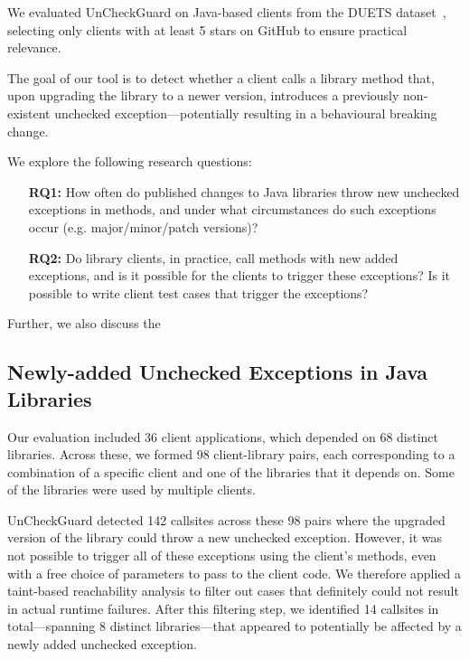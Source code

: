 We evaluated UnCheckGuard on Java-based clients from the DUETS dataset~\cite{durieux21:_duets}, selecting only clients with at least 5 stars on GitHub to ensure practical relevance.

The goal of our tool is to detect whether a client calls a library method that, upon upgrading the library to a newer version, introduces a previously non-existent unchecked exception—potentially resulting in a behavioural breaking change.

We explore the following research questions:

\begin{itemize}
  \item[\textbf{RQ1:}] How often do published changes to Java libraries throw new unchecked exceptions in methods,
and under what circumstances do such exceptions occur (e.g. major/minor/patch versions)?
  \item[\textbf{RQ2:}]  Do library clients, in practice, call methods with new added exceptions, and is it possible for the clients to trigger these exceptions? Is it possible to write client test cases that trigger the exceptions?
\end{itemize}


Further, we also discuss the 

\subsection{Newly-added Unchecked Exceptions in Java Libraries}

Our evaluation included 36 client applications, which depended on 68 distinct libraries. Across these, we formed 98 client-library pairs, each corresponding to a combination of a specific client and one of the libraries that it depends on. Some of the libraries were used by multiple clients.



UnCheckGuard detected 142 callsites across these 98 pairs where the upgraded version of the library could throw a new unchecked exception. However, it was not possible to trigger all of these exceptions using the client's methods, even with a free choice of parameters to pass to the client code. We therefore applied a taint-based reachability analysis to filter out cases that definitely could not result in actual runtime failures. After this filtering step, we identified 14 callsites in total—spanning 8 distinct libraries—that appeared to potentially be affected by a newly added unchecked exception. 

